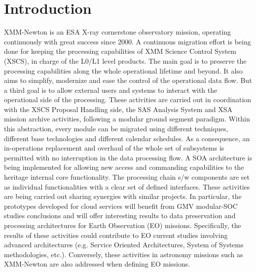 \section{Introduction}
XMM-Newton is an ESA X-ray cornerstone observatory mission, operating continuously with great success since 2000. A continuous migration effort is being done for keeping the processing capabilities of XMM Science Control System (XSCS), in charge of the L0/L1 level products. The main goal is to preserve the processing capabilities along the whole operational lifetime and beyond. It also aims to simplify, modernize and ease the control of the operational data flow. But a third goal is to allow external users and systems to interact with the operational side of the processing.
These activities are carried out in coordination with the XSCS Proposal Handling side, the SAS Analysis System and XSA mission archive activities, following a modular ground segment paradigm. Within this abstraction, every module can be migrated using different techniques, different base technologies and different calendar schedules. As a consequence, an in-operations replacement and overhaul of the whole set of subsystems is permitted with no interruption in the data processing flow. 
A SOA architecture is being implemented for allowing new access and commanding capabilities to the heritage internal core functionality. The processing chain s/w components are set as individual functionalities with a clear set of defined interfaces.
These activities are being carried out sharing synergies with similar projects. In particular, the prototypes developed for cloud services will benefit from GMV modular-SOC studies conclusions and will offer interesting results to data preservation and processing architectures for Earth Observation (EO) missions. Specifically, the results of these activities could contribute to EO  current studies involving advanced architectures (e.g. Service Oriented Architectures, System of Systems methodologies, etc.). Conversely, these activities in astronomy missions such as XMM-Newton are also addressed when defining EO missions.
